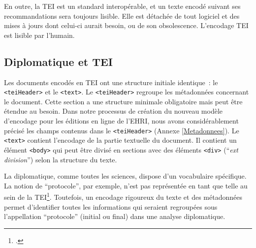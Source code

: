 En outre, la TEI est un standard interopérable, et un texte encodé suivant ses recommandations sera toujours lisible. Elle est détachée de tout logiciel et des mises à jours dont celui-ci aurait besoin, ou de son obsolescence. L'encodage TEI est lisible par l'humain.  


\subsection{Diplomatique et TEI}
Les documents encodés en TEI ont une structure initiale identique~: le \texttt{<teiHeader>} et le \texttt{<text>}. Le \texttt{<teiHeader>} regroupe les métadonnées concernant le document. Cette section a une structure minimale obligatoire mais peut être étendue au besoin. Dans notre processus de création du nouveau modèle d'encodage pour les éditions en ligne de l'EHRI, nous avons considérablement précisé les champs contenus dans le \texttt{<teiHeader>} (Annexe \ref{Metadonnees}). Le \texttt{<text>} contient l'encodage de la partie textuelle du document. Il contient un élément \texttt{<body>} qui peut être divisé en sections avec des éléments \texttt{<div>} (\enquote{\textit{ext division}}) selon la structure du texte.  

La diplomatique, comme toutes les sciences, dispose d'un vocabulaire spécifique. La notion de \enquote{protocole}, par exemple, n'est pas représentée en tant que telle au sein de la TEI\footcite[p.~185]{Clavaud2015}. Toutefois, un encodage rigoureux du texte et des métadonnées permet d'identifier toutes les informations qui seraient regroupées sous l'appellation \enquote{protocole} (initial ou final) dans une analyse diplomatique.